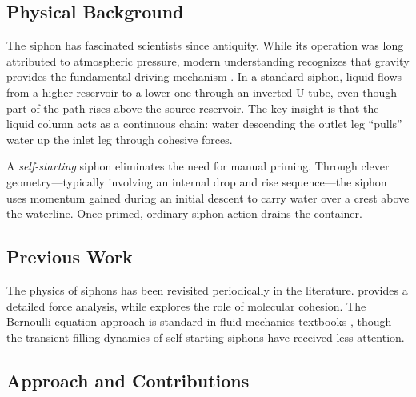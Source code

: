 \documentclass[11pt,a4paper]{article}
\theoremstyle{definition}
\begin{document}
\subsection{Physical Background}

The siphon has fascinated scientists since antiquity. While its operation was long attributed to atmospheric pressure, modern understanding recognizes that gravity provides the fundamental driving mechanism \citep{boatwright2015siphon}. In a standard siphon, liquid flows from a higher reservoir to a lower one through an inverted U-tube, even though part of the path rises above the source reservoir. The key insight is that the liquid column acts as a continuous chain: water descending the outlet leg ``pulls'' water up the inlet leg through cohesive forces.

A \emph{self-starting} siphon eliminates the need for manual priming. Through clever geometry---typically involving an internal drop and rise sequence---the siphon uses momentum gained during an initial descent to carry water over a crest above the waterline. Once primed, ordinary siphon action drains the container.

\subsection{Previous Work}

The physics of siphons has been revisited periodically in the literature. \citet{mcdonald2024siphon} provides a detailed force analysis, while \citet{potter2012siphon} explores the role of molecular cohesion. The Bernoulli equation approach is standard in fluid mechanics textbooks \citep{white2011fluid,fox2011introduction}, though the transient filling dynamics of self-starting siphons have received less attention.

\subsection{Approach and Contributions}
\end{document}
